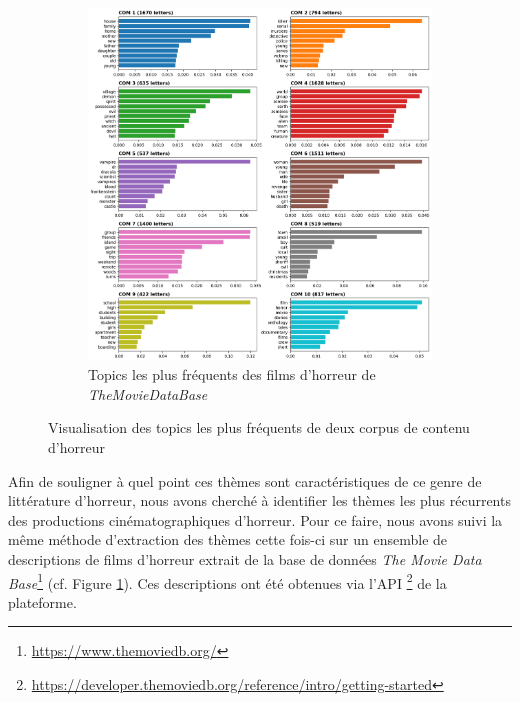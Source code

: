 \documentclass[12pt,a4paper,oneside,titlepage]{book} %
\begin{document}
\begin{figure}[htbp]
\begin{subfigure}{0.45\textwidth}
		\includegraphics[width=\textwidth]{illustration/topic_tmdb.png}
		\caption{Topics les plus fréquents des films d'horreur de \emph{TheMovieDataBase}}
		\label{fig:topic_tmdb}
	\end{subfigure}
	\caption{Visualisation des topics les plus fréquents de deux corpus de contenu d'horreur}
	\label{fig:topics_corpus}
	\end{figure}
	
	Afin de souligner à quel point ces thèmes sont caractéristiques de ce genre de littérature d'horreur, nous avons cherché à identifier les thèmes les plus récurrents des productions cinématographiques d'horreur.
	Pour ce faire, nous avons suivi la même méthode d'extraction des thèmes cette fois-ci sur un ensemble de descriptions de films d'horreur extrait de la base de données \textit{The Movie Data Base}\footnote{\url{https://www.themoviedb.org/}} (cf. Figure \ref{fig:topic_tmdb}). Ces descriptions ont été obtenues via l'API \footnote{\url{https://developer.themoviedb.org/reference/intro/getting-started}} de la plateforme.
	
\end{document}
